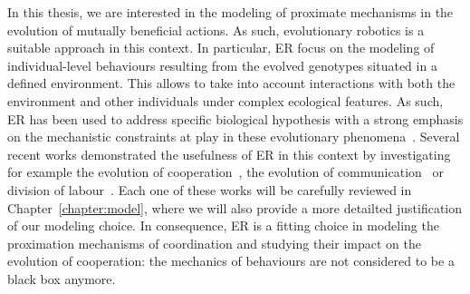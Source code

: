 
    In this thesis, we are interested in the modeling of proximate mechanisms in the evolution of mutually beneficial actions. As such, evolutionary robotics is a suitable approach in this context. In particular, ER focus on the modeling of individual-level behaviours resulting from the evolved genotypes situated in a defined environment. This allows to take into account interactions with both the environment and other individuals under complex ecological features. As such, ER has been used to address specific biological hypothesis with a strong emphasis on the mechanistic constraints at play in these evolutionary phenomena~\parencite{Floreano2010, Mitri2013}. Several recent works demonstrated the usefulness of ER in this context by investigating for example the evolution of cooperation~\parencite{Waibel2011, Waibel2009}, the evolution of communication~\parencite{Mitri2011, Wischmann2012} or division of labour~\parencite{Ferrante2015}. Each one of these works will be carefully reviewed in Chapter~\ref{chapter:model}, where we will also provide a more detailted justification of our modeling choice. In consequence, ER is a fitting choice in modeling the proximation mechanisms of coordination and studying their impact on the evolution of cooperation: the mechanics of behaviours are not considered to be a black box anymore.


